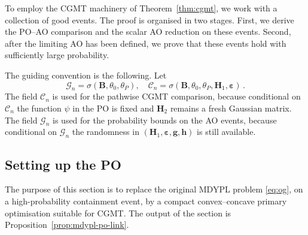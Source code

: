 \documentclass{article}
\theoremstyle{definition}
\newcommand*{\bb}{\boldsymbol}
\def\bH {\bb{H}}
\def\bh{\bb{h}}
\def\bg{\bb{g}}
\def\bH{\bb{H}}
\begin{document}
\begin{bibunit}
To employ the CGMT machinery of Theorem~\ref{thm:cgmt}, we work with a collection of good events.
The proof is organised in two stages. First, we derive the PO--AO comparison and the scalar AO reduction on these events.
Second, after the limiting AO has been defined, we prove that these events hold with sufficiently large probability.

The guiding convention is the following. Let
\begin{equation}
	\label{eq:sigma-fields}
		\mathcal{G}_n = \sigma(\bb B, \theta_0, \theta_P),
	\quad
	\mathcal{C}_n = \sigma(\bb B, \theta_0, \theta_P, \bH_1, \bb \varepsilon) \,.
\end{equation}
The field $\mathcal C_n$ is used for the pathwise CGMT comparison, because conditional on $\mathcal C_n$ the function $\psi$ in the PO is fixed and $\bH_2$ remains a fresh Gaussian matrix.
The field $\mathcal G_n$ is used for the probability bounds on the AO events, because conditional on $\mathcal G_n$ the randomness in $(\bH_1,\bb\varepsilon,\bg,\bh)$ is still available.


\subsection{Setting up the PO} \label{sec:po}

The purpose of this section is to replace the original MDYPL problem
\eqref{eq:og}, on a high-probability containment event, by a compact
convex--concave primary optimisation suitable for CGMT.
The output of the section is
Proposition~\ref{prop:mdypl-po-link}.


\end{bibunit}
\end{document}
